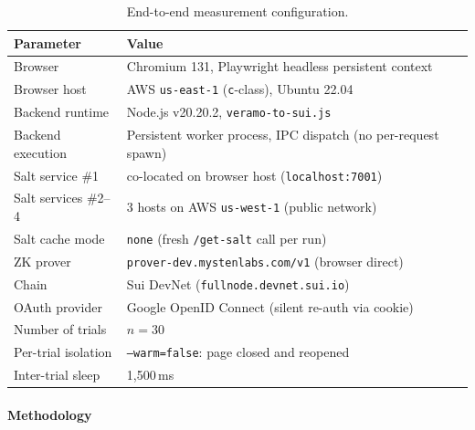 \begin{table}[h]
\centering
\small
\caption{End-to-end measurement configuration.}
\label{tab:e2e-config}
\begin{tabular}{ll}
\toprule
\textbf{Parameter} & \textbf{Value} \\
\midrule
Browser           & Chromium 131, Playwright headless persistent context \\
Browser host      & AWS \texttt{us-east-1} (\texttt{c}-class), Ubuntu 22.04 \\
Backend runtime   & Node.js v20.20.2, \texttt{veramo-to-sui.js} \\
Backend execution & Persistent worker process, IPC dispatch (no per-request spawn) \\
Salt service \#1  & co-located on browser host (\texttt{localhost:7001}) \\
Salt services \#2--4 & 3 hosts on AWS \texttt{us-west-1} (public network) \\
Salt cache mode   & \texttt{none} (fresh \texttt{/get-salt} call per run) \\
ZK prover         & \texttt{prover-dev.mystenlabs.com/v1} (browser direct) \\
Chain             & Sui DevNet (\texttt{fullnode.devnet.sui.io}) \\
OAuth provider    & Google OpenID Connect (silent re-auth via cookie) \\
Number of trials  & $n = 30$ \\
Per-trial isolation & \texttt{--warm=false}: page closed and reopened \\
Inter-trial sleep & 1{,}500\,ms \\
\bottomrule
\end{tabular}
\end{table}

\paragraph{Methodology}
\label{sec:e2e-methodology}

